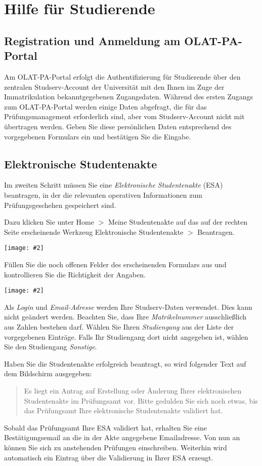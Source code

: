 \documentclass[a4paper,11pt]{article}
\newcommand{\bild}[2]{
    \begin{center}\texttt{[image: \#2]}\end{center}
}
\newcommand{\knopf}[1]{{\sc #1}}
\begin{document}
\clearpage
\section{Hilfe für Studierende}

\subsection{Registration und Anmeldung am OLAT-PA-Portal}

Am OLAT-PA-Portal erfolgt die Authentifizierung für Studierende über den
zentralen Studserv-Account der Universität mit den Ihnen im Zuge der
Immatrikulation bekanntgegebenen Zugangsdaten.  Während des ersten Zugangs zum
OLAT-PA-Portal werden einige Daten abgefragt, die für das Prüfungsmanagement
erforderlich sind, aber vom Studserv-Account nicht mit übertragen werden.
Geben Sie diese persönlichen Daten entsprechend des vorgegebenen Formulars ein
und bestätigen Sie die Eingabe.

\subsection{Elektronische Studentenakte}

Im zweiten Schritt müssen Sie eine {\em Elektronische Studentenakte} (ESA)
beantragen, in der die relevanten operativen Informationen zum
Prüfungsgeschehen gespeichert sind. 

Dazu klicken Sie unter \knopf{Home $>$ Meine Studentenakte} auf das auf der
rechten Seite erscheinende Werkzeug \knopf{Elektronische Studentenakte $>$
  Beantragen}.

\bild{.95}{ESA-Beantragen}

Füllen Sie die noch offenen Felder des erscheinenden Formulars aus und
kontrollieren Sie die Richtigkeit der Angaben.

\bild{.7}{ESA-Eingaben}

Als {\em Login} und {\em Email-Adresse} werden Ihre Studserv-Daten verwendet.
Dies kann nicht geändert werden.  Beachten Sie, dass Ihre {\em Matrikelnummer}
ausschließlich aus Zahlen bestehen darf.  Wählen Sie Ihren {\em Studiengang}
aus der Liste der vorgegebenen Einträge.  Falls Ihr Studiengang dort nicht
angegeben ist, wählen Sie den Studiengang {\em Sonstige}.

Haben Sie die Studentenakte erfolgreich beantragt, so wird folgender Text auf
dem Bildschirm ausgegeben:
\begin{quote}
  Es liegt ein Antrag auf Erstellung oder Änderung Ihrer elektronischen
  Studentenakte im Prüfungsamt vor. Bitte gedulden Sie sich noch etwas, bis
  das Prüfungsamt Ihre elektronische Studentenakte validiert hat.
\end{quote}
Sobald das Prüfungsamt Ihre ESA validiert hat, erhalten Sie eine
Bestätigungsemail an die in der Akte angegebene Emailadresse.  Von nun an
können Sie sich zu anstehenden Prüfungen einschreiben. Weiterhin wird
automatisch ein Eintrag über die Validierung in Ihrer ESA erzeugt.
\end{document}
